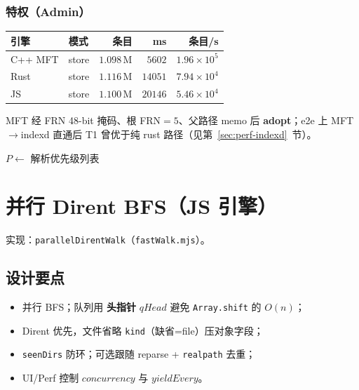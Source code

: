 \documentclass[UTF8,a4paper,11pt]{ctexart}
\begin{document}
\subsubsection*{特权（Admin）}
\begin{center}
\begin{tabular}{@{}llrrr@{}}
\toprule
引擎 & 模式 & 条目 & ms & 条目/s \\
\midrule
C++ MFT & store & $1.098\,\mathrm{M}$ & $5602$ & $1.96\times 10^5$ \\
Rust & store & $1.116\,\mathrm{M}$ & $14051$ & $7.94\times 10^4$ \\
JS & store & $1.100\,\mathrm{M}$ & $20146$ & $5.46\times 10^4$ \\
\bottomrule
\end{tabular}
\end{center}
MFT 经 FRN 48-bit 掩码、根 FRN$=5$、父路径 memo 后 \textbf{adopt}；e2e 上 MFT$\to$indexd 直通后 T1 曾优于纯 rust 路径（见第~\ref{sec:perf-indexd}~节）。

\begin{algorithm}[htbp]
\caption{WalkEngine.SelectAndStream$(V)$}
$P \leftarrow$ 解析优先级列表\;
\end{algorithm}

\section{并行 Dirent BFS（JS 引擎）}
\label{sec:bfs}

实现：\texttt{parallelDirentWalk}（\texttt{fastWalk.mjs}）。

\subsection{设计要点}
\begin{itemize}[leftmargin=1.6em]
  \item 并行 BFS；队列用 \textbf{头指针} $qHead$ 避免 \texttt{Array.shift} 的 $O(n)$；
  \item Dirent 优先，文件省略 \texttt{kind}（缺省=file）压对象字段；
  \item \texttt{seenDirs} 防环；可选跟随 reparse + \texttt{realpath} 去重；
  \item UI/Perf 控制 $concurrency$ 与 $yieldEvery$。
\end{itemize}
\end{document}
